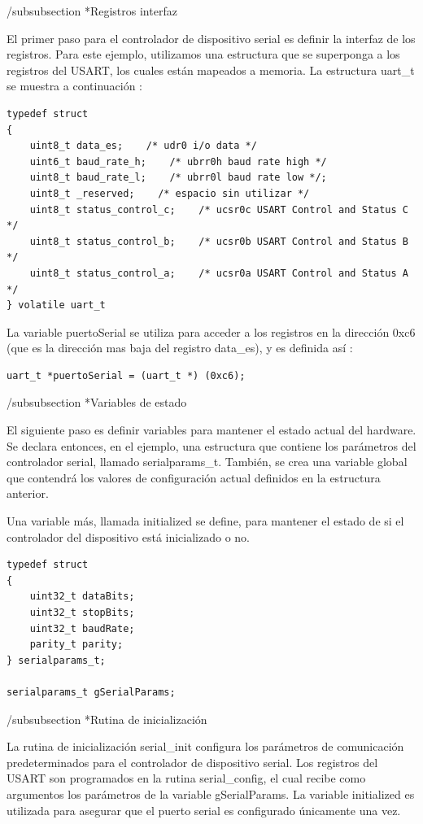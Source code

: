 \documentclass[12pt]{article}
\begin{document}
/subsubsection *{Registros interfaz}

El primer paso para el controlador de dispositivo serial es definir
la interfaz de los registros. Para este ejemplo, utilizamos
una estructura que se superponga a los registros del USART, los cuales
están mapeados a memoria. La estructura uart\_t se muestra a continuación :


\begin{verbatim}
typedef struct 
{
    uint8_t data_es;	/* udr0 i/o data */
    uint6_t baud_rate_h;    /* ubrr0h baud rate high */
    uint8_t baud_rate_l;    /* ubrr0l baud rate low */;
    uint8_t _reserved;    /* espacio sin utilizar */
    uint8_t status_control_c;    /* ucsr0c USART Control and Status C */
    uint8_t status_control_b;    /* ucsr0b USART Control and Status B */
    uint8_t status_control_a;    /* ucsr0a USART Control and Status A */
} volatile uart_t
\end{verbatim}

La variable puertoSerial se utiliza para acceder a los registros
en la dirección 0xc6 (que es la dirección mas baja del registro data\_es),
y es definida así :

\begin{verbatim}
uart_t *puertoSerial = (uart_t *) (0xc6);
\end{verbatim}


/subsubsection *{Variables de estado}

El siguiente paso es definir variables para mantener el estado actual
del hardware. Se declara entonces, en el ejemplo, una estructura
que contiene los parámetros del controlador serial, llamado serialparams\_t.
También, se crea una variable global que contendrá los valores 
de configuración actual definidos en la estructura anterior.

Una variable más, llamada initialized se define, para mantener el estado 
de si el 
controlador del dispositivo está inicializado o no.

\begin{verbatim}
typedef struct
{
    uint32_t dataBits;
    uint32_t stopBits;
    uint32_t baudRate;
    parity_t parity;
} serialparams_t;

serialparams_t gSerialParams;
\end{verbatim}


/subsubsection *{Rutina de inicialización}

La rutina de inicialización serial\_init configura los parámetros de comunicación
predeterminados para el controlador de dispositivo serial.
Los registros del USART son programados en la rutina serial\_config, el
cual recibe como argumentos los parámetros de la variable gSerialParams.
La variable initialized es utilizada para asegurar que el puerto
serial es configurado únicamente una vez.
\end{document}
